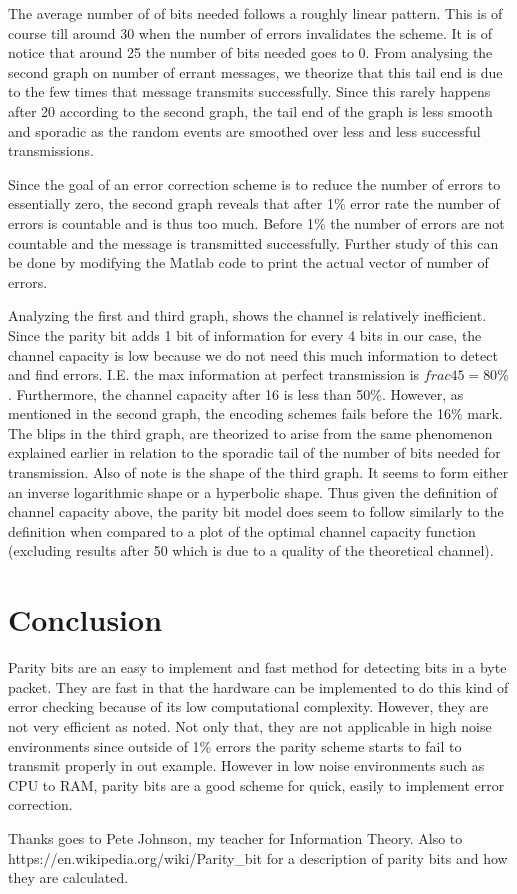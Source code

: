 \documentclass{article}
\begin{document}
      The average number of of bits needed follows a roughly linear pattern. This
      is of course till around 30 when the number of errors invalidates the
      scheme. It is of notice that around 25 the number of bits needed goes to
      0. From analysing the second graph on number of errant messages, we
      theorize that this tail end is due to the few times that message transmits
      successfully. Since this rarely happens after 20 according to the second
      graph, the tail end of the graph is less smooth and sporadic as the
      random events are smoothed over less and less successful transmissions.

      Since the goal of an error correction scheme is to reduce the number of
      errors to essentially zero, the second graph reveals that after 1\% error
      rate the number of errors is countable and is thus too much. Before 1\%
      the number of errors are not countable and the message is transmitted
      successfully. Further study of this can be done by modifying the Matlab
      code to print the actual vector of number of errors.

      Analyzing the first and third graph, shows the channel is relatively
      inefficient. Since the parity bit adds 1 bit of information for every 4 bits
      in our case, the channel capacity is low because we do not need this much
      information to detect and find errors. I.E. the max information at perfect
      transmission is $frac{4}{5}=80\%$.
      Furthermore, the channel capacity after 16 is less than 50\%.
      However, as mentioned in the second graph, the encoding
      schemes fails before the 16\% mark. The blips in the third graph,
      are theorized to arise from the same phenomenon explained earlier in
      relation to the sporadic tail of the number of bits needed for transmission.
      Also of note is the shape of the third graph. It seems to form either an
      inverse logarithmic shape or a hyperbolic shape. Thus given the definition
      of channel capacity above, the parity bit model does seem to follow
      similarly to the definition when compared to a plot of the optimal
      channel capacity function (excluding results after 50 which is due to
      a quality of the theoretical channel).
   \section{Conclusion}
      Parity bits are an easy to implement and fast method for detecting bits
      in a byte packet. They are fast in that the hardware can
      be implemented to do this kind of error checking because of its low
      computational complexity.
      However, they are not very efficient as noted. Not only
      that, they are not applicable in high noise environments since outside of
      1\% errors the parity scheme starts to fail to transmit properly in
      out example. However
      in low noise environments such as CPU to RAM, parity bits are a good scheme
      for quick, easily to implement error correction.
      
      Thanks goes to Pete Johnson, my teacher for Information Theory. Also
      to https://en.wikipedia.org/wiki/Parity\_bit for a description of parity
      bits and how they are calculated.
\end{document}
